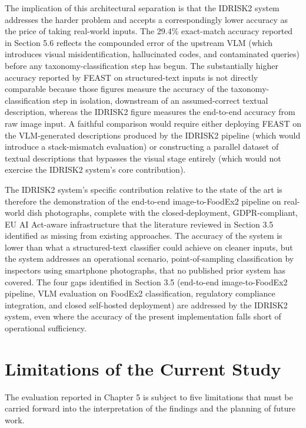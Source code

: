 The implication of this architectural separation is that the IDRISK2 system addresses the harder problem and accepts a correspondingly lower accuracy as the price of taking real-world inputs. The 29.4\% exact-match accuracy reported in Section 5.6 reflects the compounded error of the upstream VLM (which introduces visual misidentification, hallucinated codes, and contaminated queries) before any taxonomy-classification step has begun. The substantially higher accuracy reported by FEAST on structured-text inputs \parencite{lorenzo_molfetta_47d7c4cd} is not directly comparable because those figures measure the accuracy of the taxonomy-classification step in isolation, downstream of an assumed-correct textual description, whereas the IDRISK2 figure measures the end-to-end accuracy from raw image input. A faithful comparison would require either deploying FEAST on the VLM-generated descriptions produced by the IDRISK2 pipeline (which would introduce a stack-mismatch evaluation) or constructing a parallel dataset of textual descriptions that bypasses the visual stage entirely (which would not exercise the IDRISK2 system's core contribution).

The IDRISK2 system's specific contribution relative to the state of the art is therefore the demonstration of the end-to-end image-to-FoodEx2 pipeline on real-world dish photographs, complete with the closed-deployment, GDPR-compliant, EU AI Act-aware infrastructure that the literature reviewed in Section 3.5 identified as missing from existing approaches. The accuracy of the system is lower than what a structured-text classifier could achieve on cleaner inputs, but the system addresses an operational scenario, point-of-sampling classification by inspectors using smartphone photographs, that no published prior system has covered. The four gaps identified in Section 3.5 (end-to-end image-to-FoodEx2 pipeline, VLM evaluation on FoodEx2 classification, regulatory compliance integration, and closed self-hosted deployment) are addressed by the IDRISK2 system, even where the accuracy of the present implementation falls short of operational sufficiency.

\hypertarget{limitations-of-the-current-study}{%
\section{Limitations of the Current Study}\label{limitations-of-the-current-study}}

The evaluation reported in Chapter 5 is subject to five limitations that must be carried forward into the interpretation of the findings and the planning of future work.


